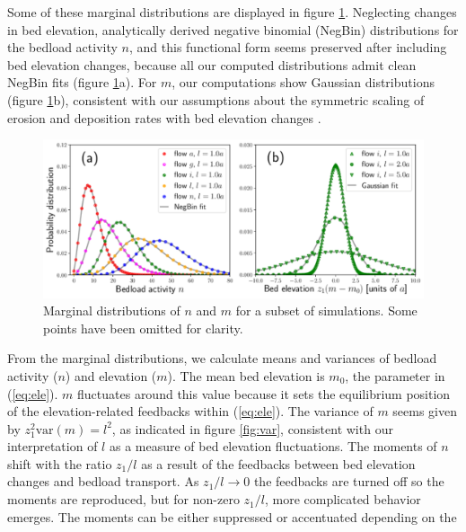 \documentclass[draft]{agujournal2018}
\begin{document}
Some of these marginal distributions are displayed in figure \ref{fig:pdfs}.
Neglecting changes in bed elevation, \citet{Ancey2008} analytically derived negative binomial (NegBin) distributions for the bedload activity $n$, and this functional form seems preserved after including bed elevation changes, because all our computed distributions admit clean NegBin fits (figure \ref{fig:pdfs}a).
For $m$, our computations show Gaussian distributions (figure \ref{fig:pdfs}b), consistent with our assumptions about the symmetric scaling of erosion and deposition rates with bed elevation changes \citep[e.g.][]{Wong2007}.

\begin{figure}[t!]
	\includegraphics[width=\linewidth,keepaspectratio]{./figures/montage2.pdf}
	\caption{Marginal distributions of $n$ and $m$ for a subset of simulations. Some points have been omitted for clarity.}
	\label{fig:pdfs}
\end{figure}

From the marginal distributions, we calculate means and variances of bedload activity ($n$) and elevation ($m$).
The mean bed elevation is $m_0$, the parameter in (\ref{eq:ele}). $m$ fluctuates around this value because it sets the equilibrium position of the elevation-related feedbacks within (\ref{eq:ele}).
The variance of $m$ seems given by $z_1^2 \text{var}(m) = l^2$, as indicated in figure \ref{fig:var}, consistent with our interpretation of $l$ as a measure of bed elevation fluctuations.
The moments of $n$ shift with the ratio $z_1/l$ as a result of the feedbacks between bed elevation changes and bedload transport.
As $z_1/l\rightarrow 0$ the feedbacks are turned off so the \citet{Ancey2008} moments are reproduced, but for non-zero $z_1/l$, more complicated behavior emerges. 
The moments can be either suppressed or accentuated depending on the 
\end{document}
